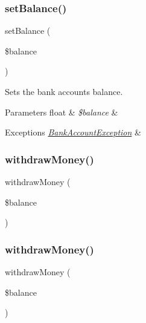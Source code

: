 \subsubsection{\texorpdfstring{set\+Balance()}{setBalance()}\hspace{0.1cm}{\footnotesize\ttfamily [2/2]}}
{\footnotesize\ttfamily set\+Balance (\begin{DoxyParamCaption}\item[{}]{\$balance }\end{DoxyParamCaption})\hspace{0.3cm}{\ttfamily [protected]}}

Sets the bank account\textquotesingle{}s balance.


\begin{DoxyParams}[1]{Parameters}
float & {\em \$balance} & \\
\hline
\end{DoxyParams}

\begin{DoxyExceptions}{Exceptions}
{\em \mbox{\hyperlink{class_bank_account_exception}{Bank\+Account\+Exception}}} & \\
\hline
\end{DoxyExceptions}
\mbox{\label{class_bank_account_af0ad76c7548c448bab3dad3e06ad4aad}} 
\subsubsection{\texorpdfstring{withdraw\+Money()}{withdrawMoney()}\hspace{0.1cm}{\footnotesize\ttfamily [1/2]}}
{\footnotesize\ttfamily withdraw\+Money (\begin{DoxyParamCaption}\item[{}]{\$balance }\end{DoxyParamCaption})}

\mbox{\label{class_bank_account_af0ad76c7548c448bab3dad3e06ad4aad}} 
\subsubsection{\texorpdfstring{withdraw\+Money()}{withdrawMoney()}\hspace{0.1cm}{\footnotesize\ttfamily [2/2]}}
{\footnotesize\ttfamily withdraw\+Money (\begin{DoxyParamCaption}\item[{}]{\$balance }\end{DoxyParamCaption})}

